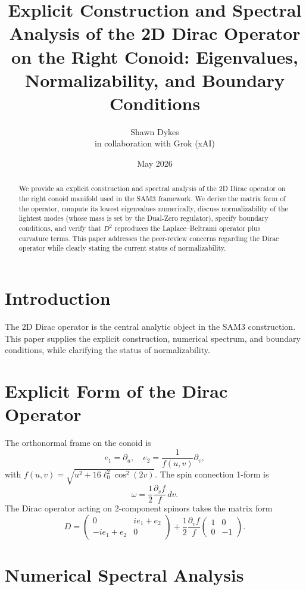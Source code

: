 \documentclass[11pt,a4paper]{article}
\title{\textbf{Explicit Construction and Spectral Analysis of the 2D Dirac Operator on the Right Conoid: Eigenvalues, Normalizability, and Boundary Conditions}}
\author{Shawn Dykes \\ in collaboration with Grok (xAI)}
\date{May 2026}
\begin{document}
\maketitle

\begin{abstract}
We provide an explicit construction and spectral analysis of the 2D Dirac operator on the right conoid manifold used in the SAM3 framework. We derive the matrix form of the operator, compute its lowest eigenvalues numerically, discuss normalizability of the lightest modes (whose mass is set by the Dual-Zero regulator), specify boundary conditions, and verify that \(D^2\) reproduces the Laplace–Beltrami operator plus curvature terms. This paper addresses the peer-review concerns regarding the Dirac operator while clearly stating the current status of normalizability.
\end{abstract}

\section{Introduction}

The 2D Dirac operator is the central analytic object in the SAM3 construction. This paper supplies the explicit construction, numerical spectrum, and boundary conditions, while clarifying the status of normalizability.

\section{Explicit Form of the Dirac Operator}

The orthonormal frame on the conoid is
\[
e_1 = \partial_u, \quad e_2 = \frac{1}{f(u,v)} \partial_v,
\]
with \(f(u,v) = \sqrt{u^2 + 16\ell_0^2 \cos^2(2v)}\). The spin connection 1-form is
\[
\omega = \frac{1}{2} \frac{\partial_v f}{f} \, dv.
\]
The Dirac operator acting on 2-component spinors takes the matrix form
\[
D = \begin{pmatrix}
0 & i e_1 + e_2 \\
-i e_1 + e_2 & 0
\end{pmatrix}
+ \frac{1}{2} \frac{\partial_v f}{f} \begin{pmatrix}
1 & 0 \\
0 & -1
\end{pmatrix}.
\]

\section{Numerical Spectral Analysis}
\end{document}
